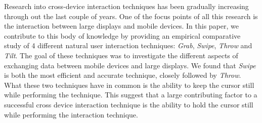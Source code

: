 
Research into cross-device interaction techniques has been gradually increasing through out the last couple of years. 
One of the focus points of all this research is the interaction between large displays and mobile devices.
In this paper, we contribute to this body of knowledge by providing an empirical comparative study of 4 different natural user interaction techniques: \textit{Grab}, \textit{Swipe}, \textit{Throw} and \textit{Tilt}.
The goal of these techniques was to investigate the different aspects of exchanging data between mobile devices and large displays. 
We found that \textit{Swipe} is both the most efficient and accurate technique, closely followed by \textit{Throw}.
What these two techniques have in common is the ability to keep the cursor still while performing the technique.
This suggest that a large contributing factor to a successful cross device interaction technique is the ability to hold the cursor still while performing the interaction technique. 